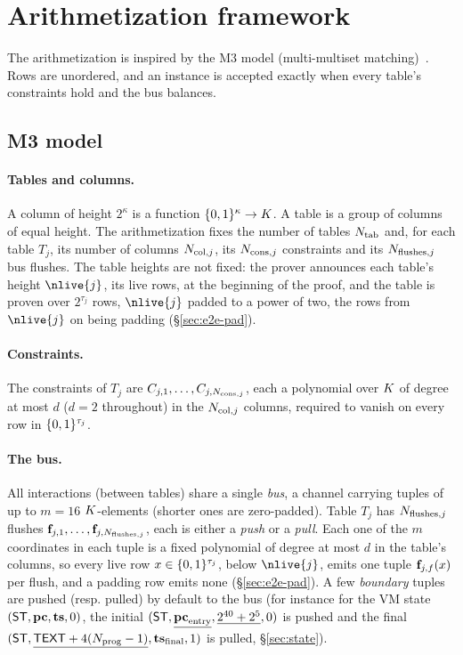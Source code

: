 \section{Arithmetization framework}\label{sec:arith}

The arithmetization is inspired by the M3 model (multi-multiset matching)~\cite{m3}. Rows are unordered, and an instance is accepted exactly when every table's constraints hold and the bus balances.

\subsection{M3 model}\label{sec:m3}

\paragraph{Tables and columns.} A column of height $2^{\kappa}$ is a function $\{0,1\}^{\kappa}\to K$. A table is a group of columns of equal height. The arithmetization fixes the number of tables $N_{\mathrm{tab}}$ and, for each table $T_j$, its number of columns $N_{\mathrm{col},j}$, its $N_{\mathrm{cons},j}$ constraints and its $N_{\mathrm{flushes},j}$ bus flushes. The table heights are not fixed: the prover announces each table's height $\nlive{j}$, its live rows, at the beginning of the proof, and the table is proven over $2^{\tau_j}$ rows, $\nlive{j}$ padded to a power of two, the rows from $\nlive{j}$ on being padding (\S\ref{sec:e2e-pad}).

\paragraph{Constraints.} The constraints of $T_j$ are $C_{j,1},\dots,C_{j,N_{\mathrm{cons},j}}$, each a polynomial over $K$ of degree at most $d$ ($d=2$ throughout) in the $N_{\mathrm{col},j}$ columns, required to vanish on every row in $\{0,1\}^{\tau_j}$.

\paragraph{The bus.} All interactions (between tables) share a single \emph{bus}, a channel carrying tuples of up to $m=16$ $K$-elements (shorter ones are zero-padded). Table $T_j$ has $N_{\mathrm{flushes},j}$ flushes $\mathbf{f}_{j,1},\dots,\mathbf{f}_{j,N_{\mathrm{flushes},j}}$, each is either a \emph{push} or a \emph{pull}. Each one of the $m$ coordinates in each tuple is a fixed polynomial of degree at most $d$ in the table's columns, so every live row $x\in\{0,1\}^{\tau_j}$, below $\nlive{j}$, emits one tuple $\mathbf{f}_{j,f}(x)$ per flush, and a padding row emits none (\S\ref{sec:e2e-pad}). A few \emph{boundary} tuples are pushed (resp. pulled) by default to the bus (for instance for the VM state $(\mathsf{ST}, \mathbf{pc}, \mathbf{ts},0)$, the initial $(\mathsf{ST}, \underline{\mathbf{pc}_{\mathrm{entry}}}, \underline{2^{40}+2^{5}},0)$ is pushed and the final $(\mathsf{ST}, \underline{\mathsf{TEXT}+4(N_{\mathrm{prog}}-1)}, \mathbf{ts}_{\mathrm{final}},1)$ is pulled, \S\ref{sec:state}).

